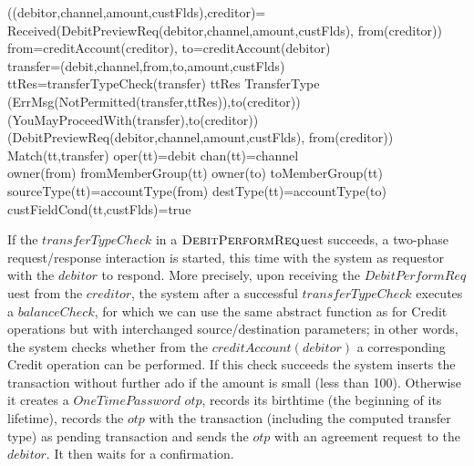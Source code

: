 \begin{asm}
((debitor,channel,amount,custFlds),creditor)=\+
  \IF Received(DebitPreviewReq(debitor,channel,amount,custFlds),
                   from(creditor)) \THEN \+  
     \LET from=creditAccount(creditor), to=creditAccount(debitor)\\
     \LET transfer=(debit,channel,from,to,amount,custFlds)\\  
     \LET ttRes=transferTypeCheck(transfer) \+
        \IF ttRes \not \in TransferType \THEN \+    (ErrMsg(NotPermitted(transfer,ttRes)),to(creditor))\-
       \ELSE~  (YouMayProceedWith(transfer),to(creditor))\dec\-
   (DebitPreviewReq(debitor,channel,amount,custFlds),
                   from(creditor)) \-
\WHERE \+
   Match(tt,transfer) \IF \+
      oper(tt)=debit \AND chan(tt)=channel \AND \\
          owner(from) \in fromMemberGroup(tt) \AND 
              owner(to) \in toMemberGroup(tt)  \AND \\
          sourceType(tt)=accountType(from) \AND destType(tt)=accountType(to) \AND \\
              custFieldCond(tt,custFlds)=true
\end{asm}


If the $transferTypeCheck$ in a $ \hbox{\sc DebitPerformReq}$uest succeeds, a two-phase request/response interaction is started, this time with the system as requestor with the $debitor$ to respond. More precisely, upon receiving the $DebitPerformReq$uest from the $creditor$, the system after a successful  $transferTypeCheck$ executes a $balanceCheck$, for which we can use the same abstract function as for Credit operations but with interchanged source/destination parameters; in other words, the system checks whether from the $creditAccount(debitor)$ a corresponding Credit operation can be performed. If this check succeeds the system inserts the transaction without further ado if the amount is small (less than 100). Otherwise it creates a $OneTimePassword$ $otp$, records its birthtime (the beginning of its lifetime), records the $otp$ with the transaction (including the computed transfer type) as pending transaction and sends the $otp$  with an agreement request to the $debitor$. It then waits for a confirmation.


